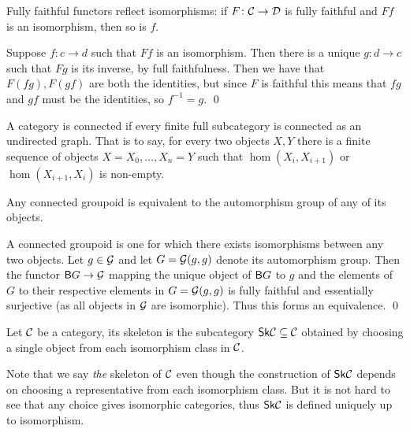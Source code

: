 \eproof

\bprop

    Fully faithful functors reflect isomorphisms: if $F\colon{{\cal C}}\to{{\cal D}}$ is fully faithful and $Ff$ is an isomorphism, then so is $f$.

\eprop

\bproof

    Suppose $f\colon c\to d$ such that $Ff$ is an isomorphism.
    Then there is a unique $g\colon d\to c$ such that $Fg$ is its inverse, by full faithfulness.
    Then we have that $F(fg),F(gf)$ are both the identities, but since $F$ is faithful this means that $fg$ and $gf$ must be the identities, so $f^{-1}=g$.
    \qed

\eproof

\bdefn

    A category is {\emphcolor connected} if every finite full subcategory is connected as an undirected graph.
    That is to say, for every two objects $X,Y$ there is a finite sequence of objects $X=X_0,\dots,X_n=Y$ such that $\hom(X_i,X_{i+1})$ or $\hom(X_{i+1},X_i)$ is non-empty.

\edefn

\bcoro

    Any connected groupoid is equivalent to the automorphism group of any of its objects.

\ecoro

\bproof

    A connected groupoid is one for which there exists isomorphisms between any two objects.
    Let $g\in{\cal G}$ and let $G={\cal G}(g,g)$ denote its automorphism group.
    Then the functor ${\sf B} G\to{\cal G}$ mapping the unique object of ${\sf B} G$ to $g$ and the elements of $G$ to their respective elements in $G={\cal G}(g,g)$ is fully faithful and essentially surjective
    (as all objects in ${\cal G}$ are isomorphic).
    Thus this forms an equivalence.
    \qed

\eproof

\bdefn

    Let ${{\cal C}}$ be a category, its {\emphcolor skeleton} is the subcategory ${\sf Sk}{{\cal C}}\subseteq{{\cal C}}$ obtained by choosing a single object from each isomorphism class in ${{\cal C}}$.

\edefn

Note that we say {\it the\/} skeleton of ${{\cal C}}$ even though the construction of ${\sf Sk}{{\cal C}}$ depends on choosing a representative from each isomorphism class.
But it is not hard to see that any choice gives isomorphic categories, thus ${\sf Sk}{{\cal C}}$ is defined uniquely up to isomorphism.


